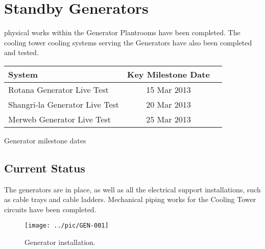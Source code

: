 


\chapter{Standby Generators }
\label{generators}

 physical works within the Generator Plantrooms have been completed. The cooling tower cooling systems serving the Generators have also been completed and tested.

           \begin{margintable} 
	    \begin{tabular}{lcl}
	      \toprule
	      System    & Key Milestone Date  \\
	      \midrule
            Rotana Generator Live Test       &  15 Mar 2013  \\   
            Shangri-la Generator Live Test   & 20 Mar 2013\\
	       Merweb Generator Live Test       &  25 Mar 2013  \\
	      \bottomrule
	    \end{tabular}
           \caption{Generator milestone dates}
           \label{tbl:KEkeydates}
            \end{margintable}
 

\section{Current Status}

The generators are in place, as well as all the electrical support installations, such as cable trays and cable ladders. Mechanical piping works for the Cooling Tower circuits have been completed. 


\begin{figure*}
  \texttt{[image: ../pic/GEN-001]}
  \caption{Generator installation.}
  \label{fig:generators}
\end{figure*}


